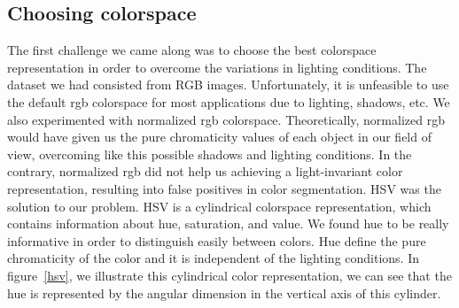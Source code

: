 \documentclass[	DIV=calc,%
							paper=a4,%
							fontsize=9pt,%
							twocolumn]{scrartcl}	 					%
\begin{document}
\subsection{Choosing colorspace}
The first challenge we came along was to choose the best colorspace representation in order to overcome the variations in lighting conditions. The dataset we had consisted from RGB images. Unfortunately, it is unfeasible to use the default rgb colorspace for most applications due to lighting, shadows,  etc. We also experimented with normalized rgb colorspace. Theoretically,  normalized rgb would have given us the pure chromaticity values of each object in our field of view, overcoming like this possible shadows and lighting conditions. In the contrary, normalized rgb did not help us achieving a light-invariant color representation, resulting into false positives in color segmentation. HSV was the solution to our problem. HSV is a cylindrical colorspace representation, which contains information about hue, saturation, and value. We found hue to be really informative in order to distinguish  easily between colors. Hue define the pure chromaticity of the color and it is independent of the lighting conditions. In figure~\ref{hsv}, we illustrate this cylindrical color representation, we can see that the hue is represented by the angular dimension in the vertical axis of this cylinder. 
\end{document}
